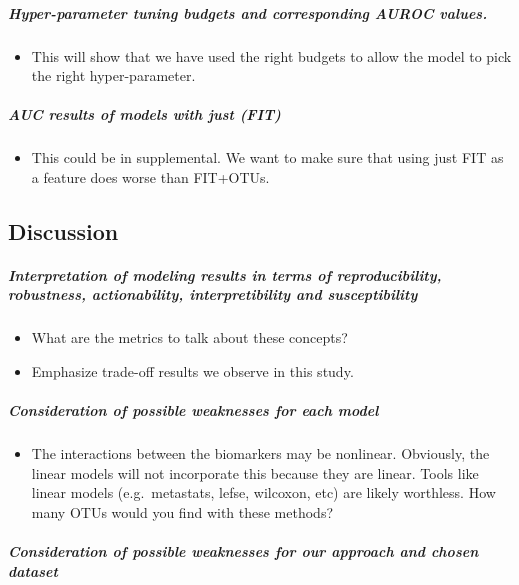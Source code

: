 \documentclass[11pt,]{article}
\providecommand{\tightlist}{%
  \setlength{\itemsep}{0pt}\setlength{\parskip}{0pt}}
\let\oldsubparagraph\subparagraph
\renewcommand{\subparagraph}[1]{\oldsubparagraph{#1}\mbox{}}
\begin{document}
\subparagraph{Hyper-parameter tuning budgets and corresponding AUROC
values.}\label{hyper-parameter-tuning-budgets-and-corresponding-auroc-values.}

\begin{itemize}
\tightlist
\item
  This will show that we have used the right budgets to allow the model
  to pick the right hyper-parameter.
\end{itemize}

\subparagraph{AUC results of models with just
(FIT)}\label{auc-results-of-models-with-just-fit}

\begin{itemize}
\tightlist
\item
  This could be in supplemental. We want to make sure that using just
  FIT as a feature does worse than FIT+OTUs.
\end{itemize}

\subsection{Discussion}\label{discussion}

\subparagraph{Interpretation of modeling results in terms of
reproducibility, robustness, actionability, interpretibility and
susceptibility}\label{interpretation-of-modeling-results-in-terms-of-reproducibility-robustness-actionability-interpretibility-and-susceptibility}

\begin{itemize}
\item
  What are the metrics to talk about these concepts?
\item
  Emphasize trade-off results we observe in this study.
\end{itemize}

\subparagraph{Consideration of possible weaknesses for each
model}\label{consideration-of-possible-weaknesses-for-each-model}

\begin{itemize}
\tightlist
\item
  The interactions between the biomarkers may be nonlinear. Obviously,
  the linear models will not incorporate this because they are linear.
  Tools like linear models (e.g.~metastats, lefse, wilcoxon, etc) are
  likely worthless. How many OTUs would you find with these methods?
\end{itemize}

\subparagraph{Consideration of possible weaknesses for our approach and
chosen
dataset}\label{consideration-of-possible-weaknesses-for-our-approach-and-chosen-dataset}
\end{document}
